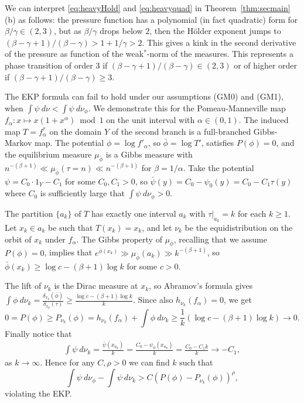 \documentclass[12pt]{article}
\numberwithin{equation}{section}
\begin{document}
  
 \begin{rmk}\label{rmkkinkm}  We can interpret  \eqref{eq:heavyHold} and \eqref{eq:heavyquad} in Theorem~\ref{thm:secmain} (b)
 as follows: the pressure function has a
polynomial (in fact quadratic) form for $\beta/\gamma \in (2,3)$, but as $\beta/\gamma$ drops below
$2$, then the H\"older exponent jumps to $(\beta-\gamma+1)/(\beta-\gamma) > 1+1/\gamma > 2$.
This gives a kink in the second derivative of the pressure as function of the weak$^*$-norm of the measures.
This represents a phase transition of order $3$ if
$(\beta-\gamma+1)/(\beta-\gamma) \in (2,3)$ or of higher order if
$(\beta-\gamma+1)/(\beta-\gamma) \geq 3$.
\end{rmk}


\begin{rmk}
The EKP formula can fail to hold under our assumptions (GM0) and (GM1), when $\int\psi~d\nu<\int\psi~d\nu_\phi$.
We demonstrate this for
the Pomeau-Manneville map $f_\alpha:x \mapsto x(1+x^\alpha) \bmod 1$ on the unit interval
with $\alpha \in (0,1)$.
The induced map $T = f_\alpha^\tau$ on the domain $Y$ of the second branch is a full-branched Gibbs-Markov map.
 The potential $\phi = \log f'_\alpha$, so $\bar\phi = \log T'$, satisfies $P(\phi)=0$, and the equilibrium measure $\mu_{\bar\phi}$ is a Gibbs measure with $n^{-(\beta+1)}\ll \mu_{\bar\phi}(\tau = n) \ll n^{-(\beta+1)}$ for $\beta = 1/\alpha$.
Take the potential $\psi = C_0 \cdot 1_Y - C_1$ for some $C_0, C_1 > 0$, so
$\bar\psi(y) = C_0-\psi_0(y) = C_0-C_1\tau(y)$ where $C_0$ is sufficiently large that $\int\psi~d\nu_\phi>0$.

The partition $\{ a_k \}$ of $T$ has exactly one interval $a_k$ with $\tau|_{a_k} = k$ for each $k \geq 1$. Let $x_k \in a_k$ be such that $T(x_k) = x_k$, and let $\nu_k$ be the equidistribution on the orbit of $x_k$ under $f_\alpha$. The Gibbs property of $\mu_{\bar\phi}$, recalling that we assume $P(\phi)=0$, implies that
$e^{\bar\phi(x_k)} \gg \mu_{\bar\phi}(a_k) \gg k^{-(\beta+1)}$,
so $\bar\phi(x_k) \ge \log c - (\beta+1)\log k$ for some $c > 0$.

The lift of $\nu_k$ is the Dirac measure at $x_k$, so Abramov's formula gives $\int\phi~d\nu_k =  \frac{ \delta_{x_k}(\bar\phi)} { \delta_{x_k}(\tau)} \geq \frac{\log c - (\beta+1)\log k}{k}$.
Since also $h_{\nu_k}(f_\alpha) = 0$, we get
$$
0 = P(\phi) \geq P_{\nu_k}(\phi) = h_{\nu_k}(f_\alpha) + \int\phi~d\nu_k \ge
\frac{1}{k}\left( \log c - (\beta+1)\log k\right)\to 0.
$$
Finally notice that
\begin{align*}
 \int\psi~d\nu_k =\frac{\bar\psi(x_{a_k})}{k} = \frac{C_0-\psi_0(x_{a_k})}{k} =   \frac{C_0-C_1 k}{k}\to -C_1,
\end{align*}
as $k \to \infty$. Hence for any $C, \rho>0$ we can find $k$ such that
$$
\int\psi~d\nu_\phi-\int\psi~d\nu_k> C\left( P(\phi)-P_{\nu_k}(\phi)\right)^\rho,
$$
violating the EKP. 



\end{rmk}
\end{document}
